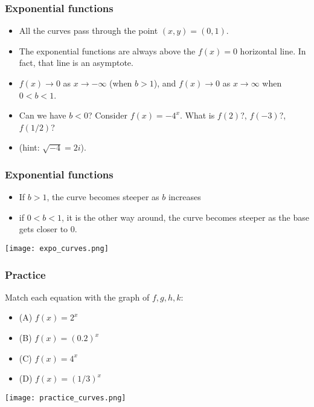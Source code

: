 \documentclass[xcolor=dvipsnames, 9pt]{beamer} %
\begin{document}
\begin{frame}
\frametitle{Exponential functions}
\begin{itemize}
\item All the curves pass through the point $(x, y) = (0, 1)$. 
\item The exponential functions are always above the $f(x) = 0$ horizontal line. In fact, that line is an asymptote. 
\item $f(x) \rightarrow 0$ as $x \rightarrow - \infty$ (when $b > 1$), and $f(x) \rightarrow 0$ as $x \rightarrow \infty$ when $0 < b < 1$. 
\item Can we have $b < 0$? Consider $f(x) = -4^x$. What is $f(2)$?, $f(-3)$?, $f(1/2)$? 
\item[] (hint: $\sqrt{-4} = 2i$). 
\end{itemize}
\end{frame}

\begin{frame}
\frametitle{Exponential functions}
\begin{itemize}
\item If $b > 1$, the curve becomes steeper as $b$ increases
\item if $0 < b < 1$, it is the other way around, the curve becomes steeper as the base gets closer to $0$. 
\end{itemize}

\begin{center}
\texttt{[image: expo\_curves.png]}
\end{center}

\end{frame}

\begin{frame}
\frametitle{Practice}
Match each equation with the graph of $f, g, h, k$: 
\begin{itemize}
\item[](A) $f(x) = 2^x$
\item[](B) $f(x) = (0.2)^x$
\item[](C) $f(x) = 4^x$
\item[](D) $f(x) = (1/3)^x$
\end{itemize}

\begin{center}
\texttt{[image: practice\_curves.png]}
\end{center}
\end{frame}
\end{document}
